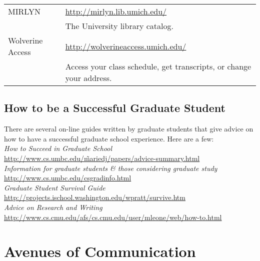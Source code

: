 \documentclass[11pt]{article}
\begin{document}
\begin{longtable}{lp{10cm}}
\hline
 MIRLYN            &  \href{http://mirlyn.lib.umich.edu/}{http://mirlyn.lib.umich.edu/}                                                                                    \\
                   &  The University library catalog.                                                                                                                      \\
\hline
 Wolverine Access  &  \href{http://wolverineaccess.umich.edu/}{http://wolverineaccess.umich.edu/}                                                                          \\
                   &  Access your class schedule, get transcripts, or change your address.                                                                                 \\
\hline
\hline
\end{longtable}
\subsection{How to be a Successful Graduate Student}
\label{sec-5_7}

There are several on-line guides written by graduate students that give advice on how to have a successful graduate school experience.  Here are a few:\\
\emph{How to Succeed in Graduate School}\\
\href{http://www.cs.umbc.edu/~mariedj/papers/advice-summary.html}{http://www.cs.umbc.edu/\~mariedj/papers/advice-summary.html}\\
\emph{Information for graduate students \& those considering graduate study}\\
\href{http://www.cs.umbc.edu/csgradinfo.html}{http://www.cs.umbc.edu/csgradinfo.html}\\
\emph{Graduate Student Survival Guide}\\
\href{http://projects.ischool.washington.edu/wpratt/survive.htm}{http://projects.ischool.washington.edu/wpratt/survive.htm}\\
\emph{Advice on Research and Writing}\\
\href{http://www.cs.cmu.edu/afs/cs.cmu.edu/user/mleone/web/how-to.html}{http://www.cs.cmu.edu/afs/cs.cmu.edu/user/mleone/web/how-to.html}\\
\newpage
\section{Avenues of Communication}
\label{sec-6}
\end{document}
